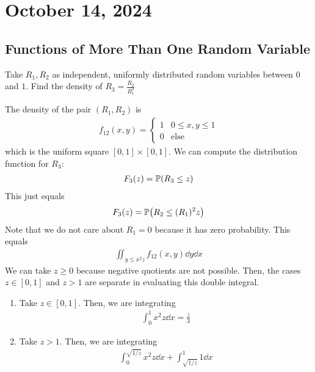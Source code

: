 \section{October 14, 2024}

\subsection{Functions of More Than One Random Variable}
\begin{example}
    Take $R_1,R_2$ as independent, uniformly distributed random variables between $0$ and $1$. Find the density of $R_3 = \frac{R_2}{R_1^2}$
\end{example}
\begin{solution}
    The density of the pair $(R_1,R_2)$ is
    \begin{align}
        f_{12}(x,y) = \begin{cases}
            1 & 0 \le x,y \le 1\\
            0 & \text{else}
        \end{cases}
    \end{align}
    which is the uniform square $[0,1] \times [0,1]$. We can compute the distribution function for $R_3$:
    \begin{align}
        F_3(z) = \mathbb{P}(R_3 \le z)
    \end{align}
    This just equals
    \begin{align}
        F_3(z) = \mathbb{P}\qty(R_2 \le (R_1)^2z)
    \end{align}
    Note that we do not care about $R_1 = 0$ because it has zero probability. This equals
    \begin{align}
        \iint_{y \le x^2 z} f_{12}(x,y) \dd{y}\dd{x}
    \end{align}
    We can take $z \ge 0$ because negative quotients are not possible. Then, the cases $z \in [0,1]$ and $z > 1$ are separate in evaluating this double integral.
    \begin{enumerate}
        \item Take $z \in [0,1]$. Then, we are integrating
        \begin{align}
            \int_0^1 x^2 z \dd{x} = \frac{z}{3}
        \end{align}
        \item Take $z > 1$. Then, we are integrating
        \begin{align}
            \int_0^{\sqrt{1/z}} x^2 z \dd{x} + \int_{\sqrt{1/z}}^1 1 \dd{x}
        \end{align}

\end{enumerate}
\end{solution}
